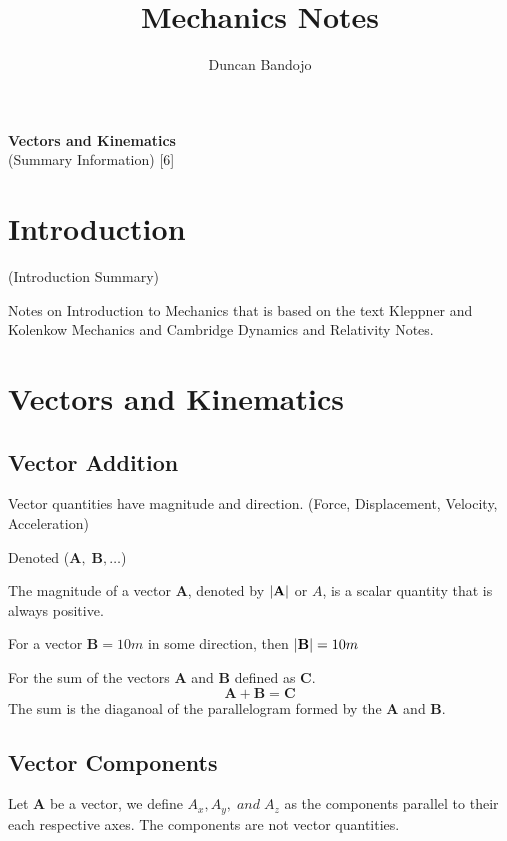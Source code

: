 \documentclass{article}
\title{Mechanics Notes}
\author{Duncan Bandojo}
\begin{document}
\maketitle
{\small \noindent\textbf{Vectors and Kinematics}\\
(Summary Information)\hspace*{\fill} [6]

\tableofcontents
\setcounter{section}{-1}
\section{Introduction}
(Introduction Summary)

Notes on Introduction to Mechanics that is based on the text Kleppner and Kolenkow Mechanics 
and Cambridge Dynamics and Relativity Notes.

\section{Vectors and Kinematics}
\subsection{Vector Addition}
\begin{defi}
     Vector quantities have magnitude and direction. (Force, Displacement, Velocity, Acceleration)

     Denoted ($\textbf{A},\;\textbf{B}, \ldots$)
\end{defi}

The magnitude of a vector $\textbf{A}$, denoted by $\left\lvert \textbf{A}\right\rvert$ or $A$, is
a scalar quantity that is always positive. 
\begin{eg}
   For a vector $\textbf{B}= 10m$ in some direction, then $\left\lvert \textbf{B}\right\rvert = 10m$ 
\end{eg}
\begin{defi}
     For the sum of the vectors $\textbf{A}$ and $\textbf{B}$ defined as
     $\textbf{C}$. 
     \[\textbf{A}+\textbf{B}=\textbf{C}\] The sum is the diaganoal of the
     parallelogram formed by the $\textbf{A}$ and $\textbf{B}$. 
\end{defi}
\subsection{Vector Components}
Let $\textbf{A}$ be a vector, we define $A_x, A_y,\;and\; A_z$ as the components
parallel to their each respective axes. The components are not vector quantities.

}
\end{document}
